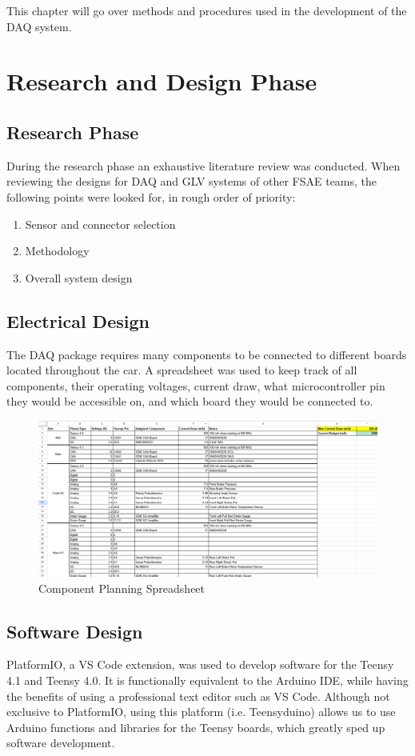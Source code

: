 This chapter will go over methods and procedures used in the development of the DAQ system.
\section{Research and Design Phase}
\subsection{Research Phase}
During the research phase an exhaustive literature review was conducted.
When reviewing the designs for DAQ and GLV systems of other FSAE teams, the following points were looked for, in rough order of priority:
\begin{enumerate}
    \item Sensor and connector selection
    \item Methodology
    \item Overall system design
\end{enumerate}

\subsection{Electrical Design}
The DAQ package requires many components to be connected to different boards located throughout the car.
A spreadsheet was used to keep track of all components, their operating voltages, current draw, what microcontroller pin they would be accessible on, and which board they would be connected to.
\begin{figure}[H]
        \centering
        \includegraphics[width=7in]{images/electricalplanning.png}
        \caption{Component Planning Spreadsheet}
        \label{fig:ep}
\end{figure}


\subsection{Software Design}
PlatformIO, a VS Code extension, was used to develop software for the Teensy 4.1 and Teensy 4.0.
It is functionally equivalent to the Arduino IDE, while having the benefits of using a professional text editor such as VS Code.
Although not exclusive to PlatformIO, using this platform (i.e. Teensyduino) allows us to use Arduino functions and libraries for the Teensy boards, which greatly sped up software development.

